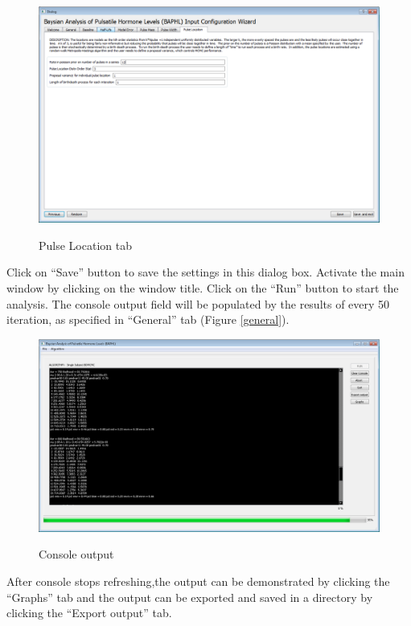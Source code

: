 \documentclass[11pt]{book}
\begin{document}
\begin{figure}
  \centering
  \includegraphics[width=\textwidth]{pulselocationtab.PNG}\\
  \caption{Pulse Location tab}\label{pulselocation}
\end{figure}
\newpage
Click on ``Save'' button to save the settings in this dialog box.  Activate the main window by clicking on the window title.  Click on the ``Run'' button to start the analysis.  The console output field will be populated by the results of every 50 iteration, as specified in ``General'' tab (Figure \ref{general}).
\begin{figure}
  \centering
  \includegraphics[width=\textwidth]{consoleoutput.PNG}\\
  \caption{Console output}\label{consoleoutput}
\end{figure}

After console stops refreshing,the output can be demonstrated by clicking the ``Graphs'' tab and the output can be exported and saved in  a directory by clicking the ``Export output'' tab.
\end{document}
